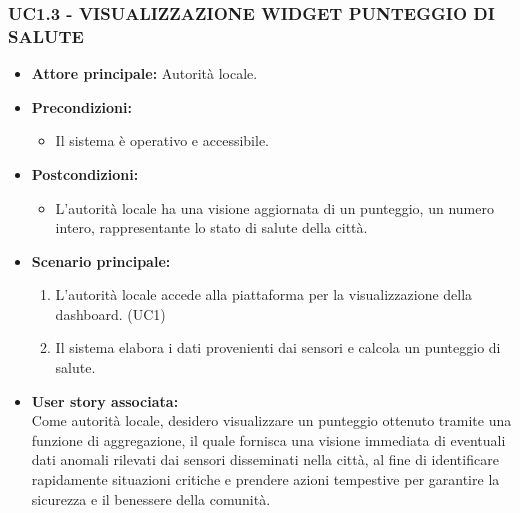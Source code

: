 \subsubsection{UC1.3 - VISUALIZZAZIONE WIDGET PUNTEGGIO DI SALUTE}
\begin{itemize}
    \item \textbf{Attore principale:} Autorità locale.
    \item \textbf{Precondizioni:}
        \begin{itemize}
            \item Il sistema è operativo e accessibile.
        \end{itemize}
    \item \textbf{Postcondizioni:}
        \begin{itemize}
            \item L'autorità locale ha una visione aggiornata di un punteggio, un numero intero, rappresentante lo stato di salute della città.
        \end{itemize}
    \item \textbf{Scenario principale:}
          \begin{enumerate}
            \item L'autorità locale accede alla piattaforma per la visualizzazione della dashboard. (UC1)
            \item Il sistema elabora i dati provenienti dai sensori e calcola un punteggio di salute.
        \end{enumerate}
    \item \textbf{User story associata:} \\
        Come autorità locale, desidero visualizzare un punteggio ottenuto tramite una funzione di aggregazione, il quale fornisca una visione immediata di eventuali dati anomali rilevati dai sensori disseminati nella città, al fine di identificare rapidamente situazioni critiche e prendere azioni tempestive per garantire la sicurezza e il benessere della comunità.
\end{itemize}